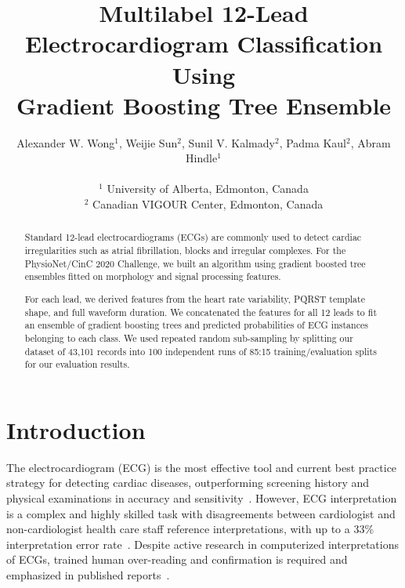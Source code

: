 \documentclass[twocolumn]{cinc}
\begin{document}


\title{Multilabel 12-Lead Electrocardiogram Classification Using \\
Gradient Boosting Tree Ensemble}

\author {Alexander W. Wong$^{1}$, Weijie Sun$^{2}$, Sunil V. Kalmady$^{2}$, Padma Kaul$^{2}$, Abram Hindle$^{1}$\\
\ \\
 $^1$ University of Alberta, Edmonton, Canada \\
$^2$ Canadian VIGOUR Center, Edmonton, Canada }

\maketitle

\begin{abstract}

Standard 12-lead electrocardiograms (ECGs) are commonly used to detect cardiac irregularities such as atrial fibrillation, blocks and irregular complexes.
For the PhysioNet/CinC 2020 Challenge, we built an algorithm using gradient boosted tree ensembles fitted on morphology and signal processing features.

For each lead, we derived features from the heart rate variability, PQRST template shape, and full waveform duration.
We concatenated the features for all 12 leads to fit an ensemble of gradient boosting trees and predicted probabilities of ECG instances belonging to each class.
We used repeated random sub-sampling by splitting our dataset of 43,101 records into 100 independent runs of 85:15 training/evaluation splits for our evaluation results.

\end{abstract}

\section{Introduction}

The electrocardiogram (ECG) is the most effective tool and current best practice strategy for detecting cardiac diseases, outperforming screening history and physical examinations in accuracy and sensitivity~\cite{harmon_effectiveness_2015}.
However, ECG interpretation is a complex and highly skilled task with disagreements between cardiologist and non-cardiologist health care staff reference interpretations, with up to a 33\% interpretation error rate~\cite{mele_improving_2008}.
Despite active research in computerized interpretations of ECGs, trained human over-reading and confirmation is required and emphasized in published reports~\cite{schlapfer_computer-interpreted_2017}.
\end{document}
